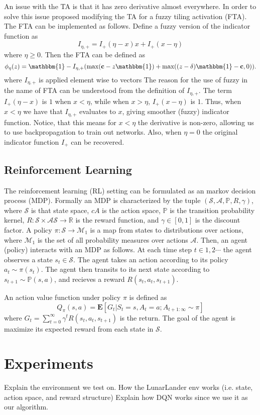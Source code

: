 \documentclass{article}
\newcommand{\RR}{\mathbb{R}}
\newcommand{\PP}{\mathbb{P}}
\newcommand{\cS}{\mathcal{S}}
\newcommand{\cA}{\mathcal{A}}
\newcommand{\cM}{\mathcal{M}}
\begin{document}
An issue with the TA is that it has zero derivative almost everywhere.
In order to solve this issue \cite{pan2019fuzzy} proposed modifying the TA for a fuzzy tiling activation (FTA).
The FTA can be implemented as follows.
Define a fuzzy version of the indicator function as 
$$I_{\eta, +} = I_+(\eta -x)x + I_+(x - \eta)$$
where $\eta \ge 0$.
Then the FTA can be defined as
$$\phi_\eta(z) = \mathbbm{1} - I_{\eta, +} (\max(\mathbf{c} - z \mathbbm{1}) + \max((z-\delta)\mathbbm{1} - \mathbf{c}, 0)).$$
where $I_{\eta, +}$ is applied element wise to vectors
The reason for the use of fuzzy in the name of FTA can be understood from the definition of $I_{\eta, +}$.
The term $I_+(\eta -x)$ is $1$ when $x < \eta$, while when $x > \eta$, $I_+(x - \eta)$ is $1$.
Thus, when $x < \eta$ we have that $I_{\eta ,+}$ evaluates to $x$, giving smoother (fuzzy) indicator function.
Notice, that this means for $x < \eta$ the derivative is non-zero, allowing us to use backpropagation to train out networks.
Also, when $\eta = 0$ the original indicator function $I_+$ can be recovered.

\subsection{Reinforcement Learning}
The reinforcement learning (RL) setting can be formulated as an markov decision process (MDP).
Formally an MDP is characterized by the tuple $(\cS, \cA, \PP, R, \gamma)$, where $\cS$ is that state space, $cA$ is the action space,
$\PP$ is the transition probability kernel, $R: \cS \times \cA \cS \to \RR$ is the reward function, and $\gamma \in [0, 1]$ is the discount factor.
A policy $\pi: \cS \to \cM_1$ is a map from states to distributions over actions, where $\cM_1$ is the set of all probability measures over actions $\cA$.
Then, an agent (policy) interacts with an MDP as follows.
At each time step $t \in 1, 2 \cdots$ the agent observes a state $s_t \in \cS$.
The agent takes an action according to its policy $a_t \sim \pi(s_t)$.
The agent then transits to its next state according to $s_{t+1} \sim \PP(s, a)$, and recieves a reward $R(s_t, a_t, s_{t+1})$.

An action value function under policy $\pi$ is defined as 
$$Q_\pi(s, a) = \mathbf{E}[G_t|S_t =s, A_t=a; A_{t+1: \infty} \sim \pi]$$
where $G_t = \sum_{t=0}^\infty \gamma^t R(s_t, a_t, s_{t+1})$ is the return.
The goal of the agent is maximize its expected reward from each state in $\cS$.


\section{Experiments} \label{sec:experiments}
Explain the environment we test on. 
How the LunarLander env works (i.e. state, action space, and reward structure)
Explain how DQN works since we use it as our algorithm.
\end{document}
